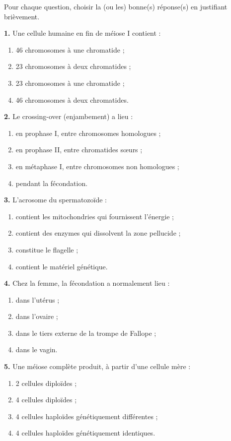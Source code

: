 \documentclass[11pt]{article}
\begin{document}
\begin{exercice}
Pour chaque question, choisir la (ou les) bonne(s) réponse(s) en justifiant brièvement.

\textbf{1.} Une cellule humaine en fin de méiose I contient :
\begin{enumerate}[label=\alph*)]
\item 46 chromosomes à une chromatide ;
\item 23 chromosomes à deux chromatides ;
\item 23 chromosomes à une chromatide ;
\item 46 chromosomes à deux chromatides.
\end{enumerate}

\textbf{2.} Le crossing-over (enjambement) a lieu :
\begin{enumerate}[label=\alph*)]
\item en prophase I, entre chromosomes homologues ;
\item en prophase II, entre chromatides sœurs ;
\item en métaphase I, entre chromosomes non homologues ;
\item pendant la fécondation.
\end{enumerate}

\textbf{3.} L'acrosome du spermatozoïde :
\begin{enumerate}[label=\alph*)]
\item contient les mitochondries qui fournissent l'énergie ;
\item contient des enzymes qui dissolvent la zone pellucide ;
\item constitue le flagelle ;
\item contient le matériel génétique.
\end{enumerate}

\textbf{4.} Chez la femme, la fécondation a normalement lieu :
\begin{enumerate}[label=\alph*)]
\item dans l'utérus ;
\item dans l'ovaire ;
\item dans le tiers externe de la trompe de Fallope ;
\item dans le vagin.
\end{enumerate}

\textbf{5.} Une méiose complète produit, à partir d'une cellule mère :
\begin{enumerate}[label=\alph*)]
\item 2 cellules diploïdes ;
\item 4 cellules diploïdes ;
\item 4 cellules haploïdes génétiquement différentes ;
\item 4 cellules haploïdes génétiquement identiques.
\end{enumerate}
\end{exercice}
\end{document}
